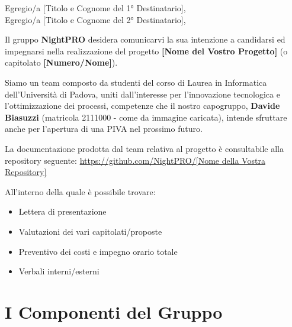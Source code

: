 \documentclass[12pt, a4paper]{article}
\begin{document}
\noindent Egregio/a [Titolo e Cognome del 1° Destinatario], \\
\noindent Egregio/a [Titolo e Cognome del 2° Destinatario],

\vspace{0.5cm}

Il gruppo \textbf{NightPRO} desidera comunicarvi la sua intenzione a candidarsi ed impegnarsi nella realizzazione del progetto \textbf{[Nome del Vostro Progetto]} (o capitolato \textbf{[Numero/Nome]}).

Siamo un team composto da studenti del corso di Laurea in Informatica dell'Università di Padova, uniti dall'interesse per l'innovazione tecnologica e l'ottimizzazione dei processi, competenze che il nostro capogruppo, \textbf{Davide Biasuzzi} (matricola 2111000 - come da immagine caricata), intende sfruttare anche per l'apertura di una PIVA nel prossimo futuro.

La documentazione prodotta dal team relativa al progetto è consultabile alla repository seguente:
\url{https://github.com/NightPRO/[Nome della Vostra Repository]}

All'interno della quale è possibile trovare:
\begin{itemize}
    \item Lettera di presentazione
    \item Valutazioni dei vari capitolati/proposte
    \item Preventivo dei costi e impegno orario totale
    \item Verbali interni/esterni
\end{itemize}


\newpage
\section*{I Componenti del Gruppo}
\end{document}

